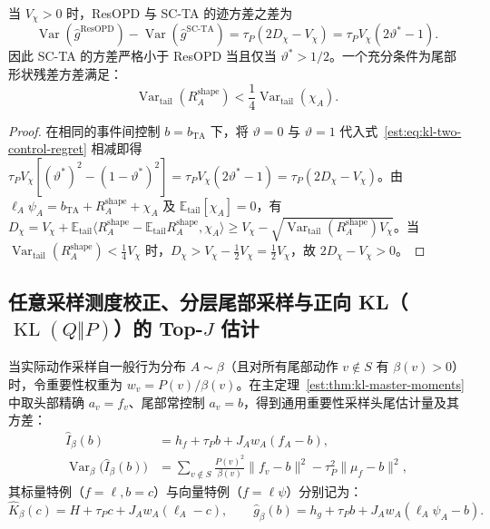 \documentclass[lang=cn,scheme=chinese,openany]{elegantbook}
\newcommand{\E}{\mathbb E}
\newcommand{\KL}{\operatorname{KL}}
\newcommand{\Var}{\operatorname{Var}}
\newcommand{\tail}{\mathrm{tail}}
\begin{document}
\begin{proposition}
当 $V_\chi>0$ 时，ResOPD 与 SC-TA 的迹方差之差为
\begin{equation*}
 \Var(\widehat g^{\mathrm{ResOPD}})
 -\Var(\widehat g^{\mathrm{SC\text{-}TA}})
 =\tau_P(2D_\chi-V_\chi)
 =\tau_P V_\chi(2\vartheta^*-1).
\end{equation*}
因此 SC-TA 的方差严格小于 ResOPD 当且仅当 $\vartheta^*>1/2$。一个充分条件为尾部形状残差方差满足：
\begin{equation*}
 \Var_{\tail}(R_A^{\mathrm{shape}})<\frac14\Var_{\tail}(\chi_A).
\end{equation*}
\end{proposition}
\begin{proof}
在相同的事件间控制 $b=b_{\mathrm{TA}}$ 下，将 $\vartheta=0$ 与 $\vartheta=1$ 代入式~\eqref{est:eq:kl-two-control-regret} 相减即得 $\tau_P V_\chi[(\vartheta^*)^2-(1-\vartheta^*)^2]=\tau_P V_\chi(2\vartheta^*-1)=\tau_P(2D_\chi-V_\chi)$。由 $\ell_A\psi_A=b_{\mathrm{TA}}+R_A^{\mathrm{shape}}+\chi_A$ 及 $\E_{\tail}[\chi_A]=0$，有 $D_\chi=V_\chi+\E_{\tail}\langle R_A^{\mathrm{shape}}-\E_{\tail}R_A^{\mathrm{shape}},\chi_A\rangle\ge V_\chi-\sqrt{\Var_{\tail}(R_A^{\mathrm{shape}})V_\chi}$。当 $\Var_{\tail}(R_A^{\mathrm{shape}})<\frac14 V_\chi$ 时，$D_\chi>V_\chi-\frac12 V_\chi=\frac12 V_\chi$，故 $2D_\chi-V_\chi>0$。
\end{proof}

\subsection{任意采样测度校正、分层尾部采样与正向 KL（\texorpdfstring{$\KL(Q\Vert P)$}{KL(Q||P)}）的 Top-\texorpdfstring{$J$}{J} 估计}

当实际动作采样自一般行为分布 $A\sim\beta$（且对所有尾部动作 $v\notin S$ 有 $\beta(v)>0$）时，令重要性权重为 $w_v=P(v)/\beta(v)$。在主定理~\ref{est:thm:kl-master-moments} 中取头部精确 $a_v=f_v$、尾部常控制 $a_v=b$，得到通用重要性采样头尾估计量及其方差：
\begin{align}
 \widehat I_\beta(b)&=h_f+\tau_P b+J_A w_A(f_A-b),
 \label{est:eq:kl-is-generic}\\
 \Var_\beta\bigl(\widehat I_\beta(b)\bigr)
 &=\sum_{v\notin S}\frac{P(v)^2}{\beta(v)}\|f_v-b\|^2
   -\tau_P^2\|\mu_f-b\|^2,
 \label{est:eq:kl-is-generic-var}
\end{align}
其标量特例（$f=\ell,b=c$）与向量特例（$f=\ell\psi$）分别记为：
\begin{equation}\label{est:eq:kl-is-scalar,est:eq:kl-is-vector}
 \widehat K_\beta(c)=H+\tau_P c+J_A w_A(\ell_A-c),\qquad
 \widehat g_\beta(b)=h_g+\tau_P b+J_A w_A(\ell_A\psi_A-b).
\end{equation}
\end{document}
